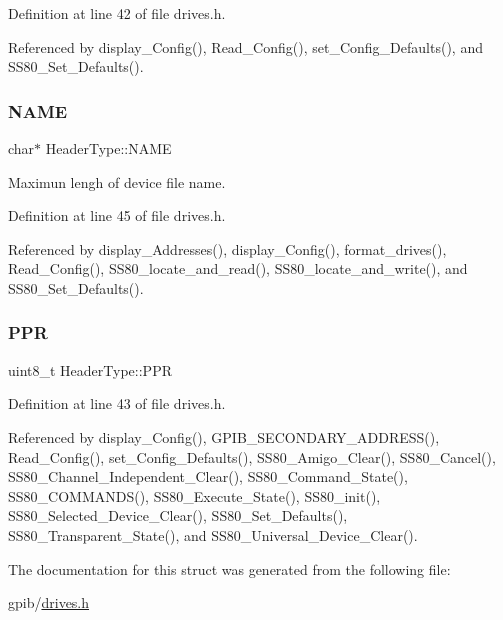Definition at line 42 of file drives.\+h.



Referenced by display\+\_\+\+Config(), Read\+\_\+\+Config(), set\+\_\+\+Config\+\_\+\+Defaults(), and S\+S80\+\_\+\+Set\+\_\+\+Defaults().

\mbox{\label{structHeaderType_a51c3f7025d3bc22c479e44f158471537}} 
\subsubsection{\texorpdfstring{N\+A\+ME}{NAME}}
{\footnotesize\ttfamily char$\ast$ Header\+Type\+::\+N\+A\+ME}



Maximun lengh of device file name. 



Definition at line 45 of file drives.\+h.



Referenced by display\+\_\+\+Addresses(), display\+\_\+\+Config(), format\+\_\+drives(), Read\+\_\+\+Config(), S\+S80\+\_\+locate\+\_\+and\+\_\+read(), S\+S80\+\_\+locate\+\_\+and\+\_\+write(), and S\+S80\+\_\+\+Set\+\_\+\+Defaults().

\mbox{\label{structHeaderType_ac642cdad0f3874495afa0ab687a56fd0}} 
\subsubsection{\texorpdfstring{P\+PR}{PPR}}
{\footnotesize\ttfamily uint8\+\_\+t Header\+Type\+::\+P\+PR}



Definition at line 43 of file drives.\+h.



Referenced by display\+\_\+\+Config(), G\+P\+I\+B\+\_\+\+S\+E\+C\+O\+N\+D\+A\+R\+Y\+\_\+\+A\+D\+D\+R\+E\+S\+S(), Read\+\_\+\+Config(), set\+\_\+\+Config\+\_\+\+Defaults(), S\+S80\+\_\+\+Amigo\+\_\+\+Clear(), S\+S80\+\_\+\+Cancel(), S\+S80\+\_\+\+Channel\+\_\+\+Independent\+\_\+\+Clear(), S\+S80\+\_\+\+Command\+\_\+\+State(), S\+S80\+\_\+\+C\+O\+M\+M\+A\+N\+D\+S(), S\+S80\+\_\+\+Execute\+\_\+\+State(), S\+S80\+\_\+init(), S\+S80\+\_\+\+Selected\+\_\+\+Device\+\_\+\+Clear(), S\+S80\+\_\+\+Set\+\_\+\+Defaults(), S\+S80\+\_\+\+Transparent\+\_\+\+State(), and S\+S80\+\_\+\+Universal\+\_\+\+Device\+\_\+\+Clear().



The documentation for this struct was generated from the following file\+:\begin{DoxyCompactItemize}
\item 
gpib/\hyperlink{drives_8h}{drives.\+h}\end{DoxyCompactItemize}
